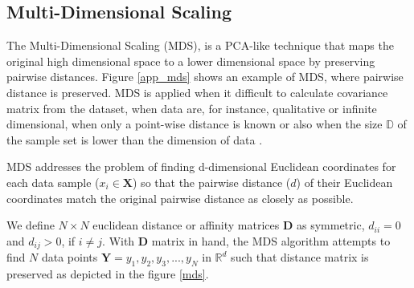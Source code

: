 \subsection{Multi-Dimensional Scaling}
\label{s:MDS}

The Multi-Dimensional Scaling (MDS), is a PCA-like technique that maps the original high dimensional space to a lower dimensional space by preserving pairwise distances. Figure \ref{app_mds} shows an example of MDS, where pairwise distance is preserved. MDS \citep{Cox2000} is applied when it difficult to calculate   covariance matrix from the dataset, when data are, for instance, qualitative or infinite dimensional, when only a point-wise distance is known or also when the size $\mathbb{D}$ of the sample set is lower than the dimension of data \citep{Ety2008}.


MDS addresses the problem of finding d-dimensional Euclidean coordinates
for each data sample ($x_i \in \mathbf{X}$) so that the pairwise distance ($d$) of their Euclidean coordinates match the original pairwise distance as closely as possible. 

We define $N \times N$ euclidean distance or affinity matrices $\mathbf{D}$ as symmetric, $d_{ii}=0$ and $d_{ij}>0$, if $i \neq j$. With $\mathbf{D}$ matrix in hand, the MDS algorithm attempts to find $N$ data points $\mathbf{Y} = y_1, y_2, y_3,...,y_N$ in $\mathbb{R}^d$ such that distance matrix is preserved as depicted in the figure \ref{mds}.


